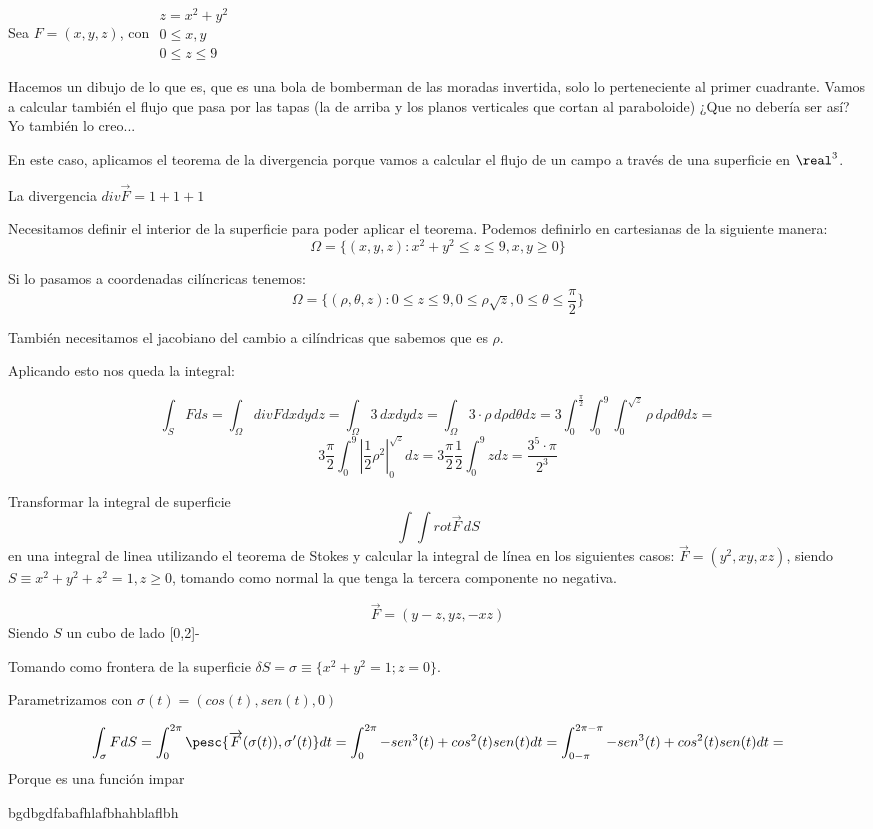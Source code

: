 \begin{problem}[17]
Sea $F = (x,y,z)$, con $\begin{array}{cc}
z = x^2+y^2\\
0\leq x,y\\
0\leq z\leq 9
\end{array}$

\solution
Hacemos un dibujo de lo que es, que es una bola de bomberman de las moradas invertida, solo lo perteneciente al primer cuadrante.
Vamos a calcular también el flujo que pasa por las tapas (la de arriba y los planos verticales que cortan al paraboloide) ¿Que no debería ser así? Yo también lo creo... 


En este caso, aplicamos el teorema de la divergencia porque vamos a calcular el flujo de un campo a través de una superficie en $\real^3$.

La divergencia $div \overrightarrow{F} = 1+1+1$

Necesitamos definir el interior de la superficie para poder aplicar el teorema. Podemos definirlo en cartesianas de la siguiente manera: \[\Omega = \{ (x,y,z): x^2+y^2\leq z\leq 9, x,y\geq 0\}\]

Si lo pasamos a coordenadas cilíncricas tenemos: \[\Omega = \{(\rho,\theta,z): 0\leq z\leq 9, 0\leq \rho \sqrt{z},0\leq\theta\leq\frac{\pi}{2}\}\]

También necesitamos el jacobiano del cambio a cilíndricas que sabemos que es $\rho$.

Aplicando esto nos queda la integral:

\[\int_S Fds =  \int_{\Omega} div F dxdydz = \int_{\Omega} 3\,dxdydz = \int_{\Omega}3\cdot\rho \,d\rho d\theta dz = 3 \int_0^{\frac{\pi}{2}} \int_0^9 \int_0^{\sqrt{z}} \rho\, d\rho d\theta dz =\]
\[
 3\frac{\pi}{2} \int_0^9 \left| \frac{1}{2} \rho^2\right|^{\sqrt{z}}_0 dz
 = 3\frac{\pi}{2} \frac{1}{2}\int_0^9 zdz = \frac{3^5\cdot \pi}{2^3}\]

\end{problem}

\begin{problem}[20]
Transformar la integral de superficie \[\int\int rot\overrightarrow{F}\,dS\]
en una integral de linea utilizando el teorema de Stokes y calcular la integral de línea en los siguientes casos:
\ppart
$\overrightarrow{F} = (y^2,xy,xz)$, siendo $S \equiv x^2+y^2+z^2=1, z\geq 0$, tomando como normal la que tenga la tercera componente no negativa.

\ppart
 \[\overrightarrow{F} = (y-z,yz,-xz)\]
 Siendo $S$ un cubo de lado [0,2]-
\solution

\spart
Tomando como frontera de la superficie $\delta S = \sigma \equiv\{ x^2+y^2=1; z=0\}$.

Parametrizamos con $\sigma(t) = (cos(t),sen(t),0)$

\[
\int_{\sigma} FdS = \int_0^{2\pi}
\pesc{ \overrightarrow{F}(\sigma(t)), \sigma'(t)} dt = \int_0^{2\pi} -sen^3(t) + cos^2(t)sen(t) dt = \int_{0-\pi}^{2\pi-\pi} -sen^3(t) + cos^2(t)sen(t) dt = 
\]
Porque es una función impar

\spart

bgdbgdfabafhlafbhahblaflbh

\end{problem}